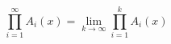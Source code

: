 

\setcounter{section}{3}
\setcounter{subsection}{4}
\setcounter{dfn}{7}

\begin{dfn}
\[
\prod_{i=1}^\infty A_i(x) = \lim_{k \to \infty} \prod_{i=1}^k A_i(x)
\]
\end{dfn}


